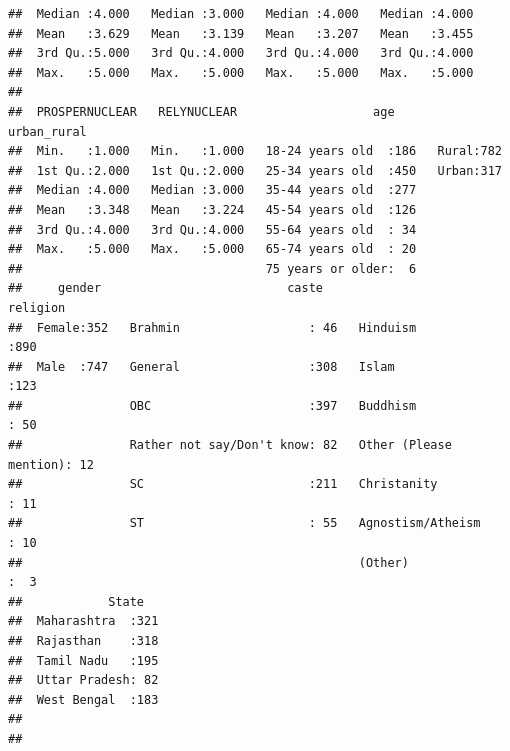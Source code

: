 \documentclass[
]{article}
\begin{document}
\begin{verbatim}
##  Median :4.000   Median :3.000   Median :4.000   Median :4.000  
##  Mean   :3.629   Mean   :3.139   Mean   :3.207   Mean   :3.455  
##  3rd Qu.:5.000   3rd Qu.:4.000   3rd Qu.:4.000   3rd Qu.:4.000  
##  Max.   :5.000   Max.   :5.000   Max.   :5.000   Max.   :5.000  
##                                                                 
##  PROSPERNUCLEAR   RELYNUCLEAR                   age      urban_rural
##  Min.   :1.000   Min.   :1.000   18-24 years old  :186   Rural:782  
##  1st Qu.:2.000   1st Qu.:2.000   25-34 years old  :450   Urban:317  
##  Median :4.000   Median :3.000   35-44 years old  :277              
##  Mean   :3.348   Mean   :3.224   45-54 years old  :126              
##  3rd Qu.:4.000   3rd Qu.:4.000   55-64 years old  : 34              
##  Max.   :5.000   Max.   :5.000   65-74 years old  : 20              
##                                  75 years or older:  6              
##     gender                          caste                       religion  
##  Female:352   Brahmin                  : 46   Hinduism              :890  
##  Male  :747   General                  :308   Islam                 :123  
##               OBC                      :397   Buddhism              : 50  
##               Rather not say/Don't know: 82   Other (Please mention): 12  
##               SC                       :211   Christanity           : 11  
##               ST                       : 55   Agnostism/Atheism     : 10  
##                                               (Other)               :  3  
##            State    
##  Maharashtra  :321  
##  Rajasthan    :318  
##  Tamil Nadu   :195  
##  Uttar Pradesh: 82  
##  West Bengal  :183  
##                     
## 
\end{verbatim}
\end{document}

